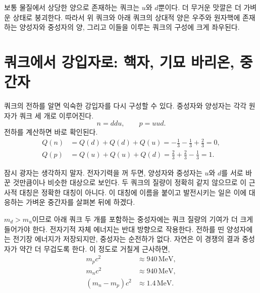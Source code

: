 보통 물질에서 상당한 양으로 존재하는 쿼크는 \(u\)와 \(d\)뿐이다. 더 무거운 맛깔은 더 가벼운 상태로 붕괴한다. 따라서 위 쿼크와 아래 쿼크의 상대적 양은 우주와 원자핵에 존재하는 양성자와 중성자의 양, 그리고 이들을 이루는 쿼크의 구성에 크게 좌우된다.

\begin{classroomqa}
\end{classroomqa}

\section{쿼크에서 강입자로: 핵자, 기묘 바리온, 중간자}

쿼크의 전하를 알면 익숙한 강입자를 다시 구성할 수 있다. 중성자와 양성자는 각각 원자가 쿼크 세 개로 이루어진다.
\begin{equation}
n=ddu,
\qquad
p=uud.
\end{equation}
전하를 계산하면 바로 확인된다.
\begin{align}
Q(n) &= Q(d)+Q(d)+Q(u)
= -\frac13-\frac13+\frac23
=0,\\
Q(p) &= Q(u)+Q(u)+Q(d)
= \frac23+\frac23-\frac13
=1.
\end{align}

잠시 광자는 생각하지 말자. 전자기력을 꺼 두면, 양성자와 중성자는 \(u\)와 \(d\)를 서로 바꾼 것만큼이나 비슷한 대상으로 보인다. 두 쿼크의 질량이 정확히 같지 않으므로 이 근사적 대칭은 정확한 대칭이 아니다. 이 대칭에 이름을 붙이고 발전시키는 일은 이에 대응하는 가벼운 중간자를 살펴본 뒤에 하겠다.

\(m_d>m_u\)이므로 아래 쿼크 두 개를 포함하는 중성자에는 쿼크 질량의 기여가 더 크게 들어가야 한다. 전자기적 자체 에너지는 반대 방향으로 작용한다. 전하를 띤 양성자에는 전기장 에너지가 저장되지만, 중성자는 순전하가 없다. 자연은 이 경쟁의 결과 중성자가 약간 더 무겁도록 한다. 이 정도로 거칠게 근사하면,
\begin{align}
m_pc^2&\approx940\,\mathrm{MeV},\\
m_nc^2&\approx940\,\mathrm{MeV},\\
(m_n-m_p)c^2&\approx1.4\,\mathrm{MeV}.
\end{align}

